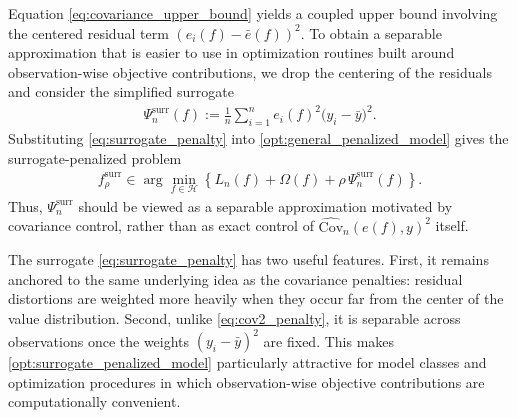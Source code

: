 \documentclass[12pt, draft]{article}
\theoremstyle{plain}
\theoremstyle{definition}
\newcommand{\1}{\mathbf{1}}
\newcommand{\Cov}{\text{Cov}}
\renewcommand{\H}{\mathcal{H}}
\begin{document}
{%

Equation \eqref{eq:covariance_upper_bound} yields a coupled upper bound involving the centered residual term $(e_i(f)-\bar e(f))^2$. To obtain a separable approximation that is easier to use in optimization routines built around observation-wise objective contributions, we drop the centering of the residuals and consider the simplified surrogate
\begin{align}
    \label{eq:surrogate_penalty}
    \Psi_n^{\mathrm{surr}}(f)
    :=
    \frac{1}{n}\sum_{i=1}^n
    e_i(f)^2\bigl(y_i-\bar y\bigr)^2.
\end{align}
Substituting \eqref{eq:surrogate_penalty} into \eqref{opt:general_penalized_model} gives the surrogate-penalized problem
\begin{align}
    \label{opt:surrogate_penalized_model}
    f_{\rho}^{\mathrm{surr}}
    \in
    \arg\min_{f\in\H}
    \left\{
        L_n(f)+\Omega(f)
        +
        \rho\,\Psi_n^{\mathrm{surr}}(f)
    \right\}.
\end{align}
Thus, $\Psi_n^{\mathrm{surr}}$ should be viewed as a separable approximation motivated by covariance control, rather than as exact control of $\widehat{\Cov}_n(e(f),y)^2$ itself.


The surrogate \eqref{eq:surrogate_penalty} has two useful features. First, it remains anchored to the same underlying idea as the covariance penalties: residual distortions are weighted more heavily when they occur far from the center of the value distribution. Second, unlike \eqref{eq:cov2_penalty}, it is separable across observations once the weights $(y_i-\bar y)^2$ are fixed. This makes \eqref{opt:surrogate_penalized_model} particularly attractive for model classes and optimization procedures in which observation-wise objective contributions are computationally convenient.

}
\end{document}
